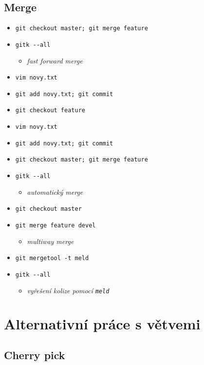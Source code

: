 \documentclass[10pt,twocolumn]{article}
\begin{document}
\subsection{Merge}

\begin{itemize}
  \item \texttt{git checkout master; git merge feature}
  \item \texttt{gitk {-}{-}all}
  \begin{itemize} \item \textit{fast forward merge} \end{itemize}
  \item \texttt{vim novy.txt}
  \item \texttt{git add novy.txt; git commit}
  \item \texttt{git checkout feature}
  \item \texttt{vim novy.txt}
  \item \texttt{git add novy.txt; git commit}
  \item \texttt{git checkout master; git merge feature}
  \item \texttt{gitk {-}{-}all}
  \begin{itemize} \item \textit{automatický merge} \end{itemize}
  \item \texttt{git checkout master}
  \item \texttt{git merge feature devel}
  \begin{itemize} \item \textit{multiway merge} \end{itemize}
  \item \texttt{git mergetool -t meld}
  \item \texttt{gitk {-}{-}all}
  \begin{itemize} \item \textit{vyřešení kolize pomocí \texttt{meld}} \end{itemize}
\end{itemize}

\section{Alternativní práce s větvemi}

\subsection{Cherry pick}
\end{document}
